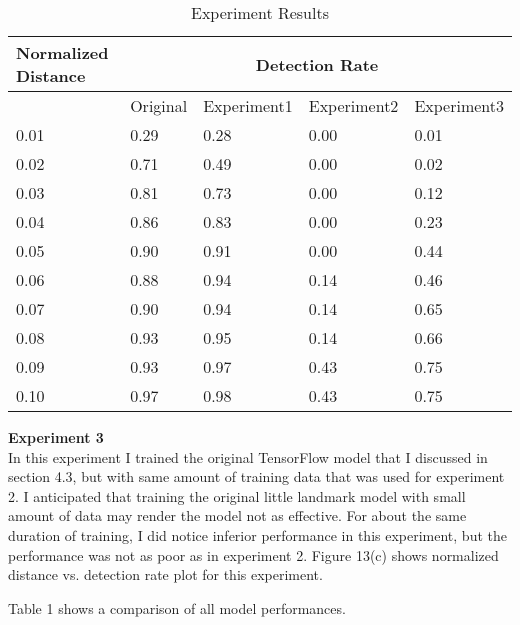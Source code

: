 \documentclass [11pt,letterpaper ,twoside ,openany ]{report}
\begin{document}
    \begin{wraptable}{r}{0.55\textwidth}
    \centering
    \tiny
    \begin{tabular}{ | p{1.4cm} | p{1.4cm} | p{1.4cm} | p{1.4cm} |  p{1.4cm}| }
    \hline
    Normalized Distance &  \multicolumn{4}{|c|}{Detection Rate} \\ \hline
    & Original & Experiment1 & Experiment2 & Experiment3 \\ \hline
    0.01 &  0.29 & 0.28 & 0.00 & 0.01 \\ \hline
    0.02 & 0.71 & 0.49 & 0.00 & 0.02 \\ \hline
    0.03 & 0.81 & 0.73 & 0.00 & 0.12 \\ \hline
    0.04 & 0.86 & 0.83 & 0.00 & 0.23 \\ \hline
    0.05 & 0.90 & 0.91 & 0.00 & 0.44 \\ \hline
    0.06 & 0.88 & 0.94 & 0.14 & 0.46 \\ \hline
    0.07 & 0.90 & 0.94 & 0.14 & 0.65 \\ \hline
    0.08 & 0.93 & 0.95 & 0.14 & 0.66 \\ \hline
    0.09 & 0.93 & 0.97 & 0.43 & 0.75 \\ \hline
    0.10 & 0.97 & 0.98 & 0.43 & 0.75 \\ \hline

    \end{tabular}
    \caption{Experiment Results}
    \label{table:exp}
    \end{wraptable}    

    \noindent
    \textbf{Experiment 3}\\             
    In this experiment I trained the original TensorFlow model that I discussed in section 4.3, but with same amount of training data that was used for experiment 2. I anticipated that training the original little landmark model with small amount of data may render the model not as effective. For about the same duration of training, I did notice inferior performance in this experiment, but the performance was not as poor as in experiment 2. Figure 13(c) shows normalized distance vs. detection rate plot for this experiment. 

    Table 1 shows a comparison of all model performances.\\
\end{document}
